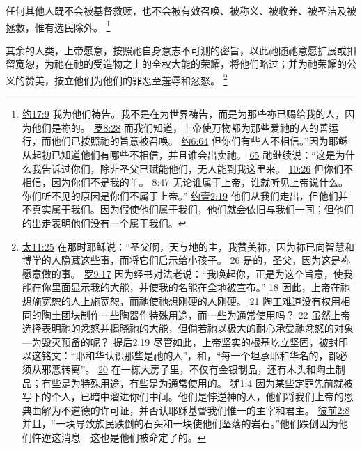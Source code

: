 \documentclass[12pt, a4paper, oneside]{ctexart}
\newcounter{parnum}[section]
\newcommand{\N}{%
   \noindent\refstepcounter{parnum}%
    \makebox[\parindent][l]{\textbf{\arabic{parnum}.}}}
\begin{document}
	任何其他人既不会被基督救赎，也不会被有效召唤、被称义、被收养、被圣洁及被拯救，惟有选民除外。
	\footnote {
		\href{https://biblehub.com/john/17-9.htm}{约17:9} 我为他们祷告。我不是在为世界祷告，而是为那些祢已赐给我的人，因为他们是祢的。
		\href{https://biblehub.com/romans/8-28.htm}{罗8:28} 而我们知道，上帝使万物都为那些爱祂的人的善运行，而他们已按照祂的旨意被召唤。
		\href{https://biblehub.com/john/6-64.htm}{约6:64} 但你们有些人不相信。”因为耶稣从起初已知道他们有哪些不相信，并且谁会出卖祂。
		\href{https://biblehub.com/john/6-65.htm}{65} 祂继续说：“这是为什么我告诉过你们，除非圣父已赋能他们，无人能到我这里来。
		\href{https://biblehub.com/john/10-26.htm}{10:26} 但你们不相信，因为你们不是我的羊。
		\href{https://biblehub.com/john/8-47.htm}{8:47} 无论谁属于上帝，谁就听见上帝说什么。你们听不见的原因是你们不属于上帝。”
		\href{https://biblehub.com/1_john/2-19.htm}{约壹2:19} 他们从我们走出，但他们并不真实属于我们。因为假使他们属于我们，他们就会依旧与我们一同；但他们的出走表明他们没有一个属于我们。
	}

\N 其余的人类，上帝愿意，按照祂自身意志不可测的密旨，以此祂随祂意愿扩展或扣留宽恕，为祂在祂的受造物之上的全权大能的荣耀，将他们略过；并为祂荣耀的公义的赞美，按立他们为他们的罪恶至羞辱和忿怒。
	\footnote {
		\href{https://biblehub.com/matthew/11-25.htm}{太11:25} 在那时耶稣说：“圣父啊，天与地的主，我赞美祢，因为祢已向智慧和博学的人隐藏这些事，而将它们启示给小孩子。
		\href{https://biblehub.com/matthew/11-26.htm}{26} 是的，圣父，因为这是祢愿意做的事。
		\href{https://biblehub.com/romans/9-17.htm}{罗9:17} 因为经书对法老说：“我唤起你，正是为这个旨意，使我能在你里面显示我的大能，并使我的名能在全地被宣布。”
		\href{https://biblehub.com/romans/9-18.htm}{18} 因此，上帝在祂想施宽恕的人上施宽恕，而祂使祂想刚硬的人刚硬。
		\href{https://biblehub.com/romans/9-21.htm}{21} 陶工难道没有权用相同的陶土团块制作一些陶器作特殊用途，而一些为通常使用吗？
		\href{https://biblehub.com/romans/9-22.htm}{22} 虽然上帝选择表明祂的忿怒并揭晓祂的大能，但倘若祂以极大的耐心承受祂忿怒的对象---为毁灭预备的呢？
		\href{https://biblehub.com/2_timothy/2-19.htm}{提后2:19} 尽管如此，上帝坚实的根基屹立坚固，被封印以这铭文：“耶和华认识那些是祂的人”，和，“每一个坦承耶和华名的，都必须从邪恶转离”。
		\href{https://biblehub.com/2_timothy/2-20.htm}{20} 在一栋大房子里，不仅有金银制品，还有木头和陶土制品；有些是为特殊用途，有些是为通常使用的。
		\href{https://biblehub.com/jude/1-4.htm}{犹1:4} 因为某些定罪先前就被写下的个人，已暗中溜进你们中间。他们是悖逆神的人，他们将我们上帝的恩典曲解为不道德的许可证，并否认耶稣基督我们惟一的主宰和君主。
		\href{https://biblehub.com/1_peter/2-8.htm}{彼前2:8} 并且，“一块导致族民跌倒的石头和一块使他们坠落的岩石。”他们跌倒因为他们忤逆这消息---这也是他们被命定了的。
	}
\end{document}
